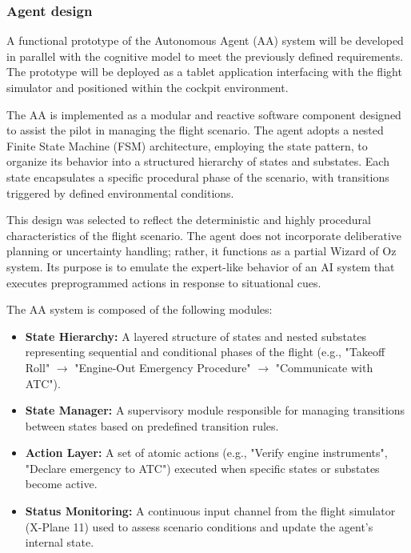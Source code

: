 \documentclass[12pt,a4paper]{article} %
\begin{document}


	\subsubsection{Agent design}
	A functional prototype of the Autonomous Agent (AA) system will be developed in parallel with the cognitive model to meet the previously defined requirements. The prototype will be deployed as a tablet application interfacing with the flight simulator and positioned within the cockpit environment.

	The AA is implemented as a modular and reactive software component designed to assist the pilot in managing the flight scenario. The agent adopts a nested Finite State Machine (FSM) architecture, employing the state pattern, to organize its behavior into a structured hierarchy of states and substates. Each state encapsulates a specific procedural phase of the scenario, with transitions triggered by defined environmental conditions.
	
	This design was selected to reflect the deterministic and highly procedural characteristics of the flight scenario. The agent does not incorporate deliberative planning or uncertainty handling; rather, it functions as a partial Wizard of Oz system. Its purpose is to emulate the expert-like behavior of an AI system that executes preprogrammed actions in response to situational cues.
	
	The AA system is composed of the following modules: \begin{itemize} \item \textbf{State Hierarchy:} A layered structure of states and nested substates representing sequential and conditional phases of the flight (e.g., "Takeoff Roll" $\rightarrow$ "Engine-Out Emergency Procedure" $\rightarrow$ "Communicate with ATC"). \item \textbf{State Manager:} A supervisory module responsible for managing transitions between states based on predefined transition rules. \item \textbf{Action Layer:} A set of atomic actions (e.g., "Verify engine instruments", "Declare emergency to ATC") executed when specific states or substates become active. \item \textbf{Status Monitoring:} A continuous input channel from the flight simulator (X-Plane 11) used to assess scenario conditions and update the agent's internal state. \end{itemize}
	
\end{document}
